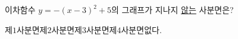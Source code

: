 이차함수 $y=-(x-3)^2+5$의 그래프가 지나지 \underline{않는} 사분면은?
\begin{choices32}{제$1$사분면}{제$2$사분면}{제$3$사분면}{제$4$사분면}{없다.}\end{choices32}
